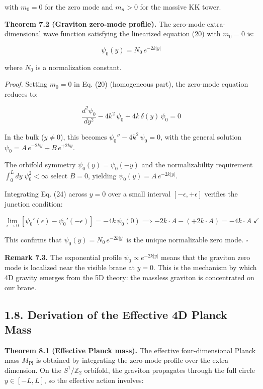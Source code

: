 \documentclass[
  11pt,
]{article}
\begin{document}
with \(m_0 = 0\) for the zero mode and \(m_n > 0\) for the massive KK
tower.

\textbf{Theorem 7.2 (Graviton zero-mode profile).} The zero-mode
extra-dimensional wave function satisfying the linearized equation (20)
with \(m_0 = 0\) is:

\[\psi_0(y) = N_0\,e^{-2k|y|} \tag{23}\]

where \(N_0\) is a normalization constant.

\emph{Proof.} Setting \(m_0 = 0\) in Eq. (20) (homogeneous part), the
zero-mode equation reduces to:

\[\frac{d^2\psi_0}{dy^2} - 4k^2\,\psi_0 + 4k\,\delta(y)\,\psi_0 = 0 \tag{24}\]

In the bulk (\(y \neq 0\)), this becomes
\(\psi_0'' - 4k^2\,\psi_0 = 0\), with the general solution
\(\psi_0 = A\,e^{-2ky} + B\,e^{+2ky}\).

The orbifold symmetry \(\psi_0(y) = \psi_0(-y)\) and the normalizability
requirement \(\int_0^L dy\;\psi_0^2 < \infty\) select \(B = 0\),
yielding \(\psi_0(y) = A\,e^{-2k|y|}\).

Integrating Eq. (24) across \(y = 0\) over a small interval
\([-\epsilon, +\epsilon]\) verifies the junction condition:

\[\lim_{\epsilon \to 0}\left[\psi_0'(\epsilon) - \psi_0'(-\epsilon)\right] = -4k\,\psi_0(0) \implies -2k\cdot A - (+2k\cdot A) = -4k\cdot A \;\checkmark \tag{25}\]

This confirms that \(\psi_0(y) = N_0\,e^{-2k|y|}\) is the unique
normalizable zero mode. \(\square\)

\textbf{Remark 7.3.} The exponential profile
\(\psi_0 \propto e^{-2k|y|}\) means that the graviton zero mode is
localized near the visible brane at \(y = 0\). This is the mechanism by
which 4D gravity emerges from the 5D theory: the massless graviton is
concentrated on our brane.

\bigskip

\hypertarget{derivation-of-the-effective-4d-planck-mass}{%
\subsection{1.8. Derivation of the Effective 4D Planck
Mass}\label{derivation-of-the-effective-4d-planck-mass}}

\textbf{Theorem 8.1 (Effective Planck mass).} The effective
four-dimensional Planck mass \(M_{\text{Pl}}\) is obtained by
integrating the zero-mode profile over the extra dimension. On the
\(S^1/\mathbb{Z}_2\) orbifold, the graviton propagates through the full
circle \(y \in [-L, L]\), so the effective action involves:
\end{document}

